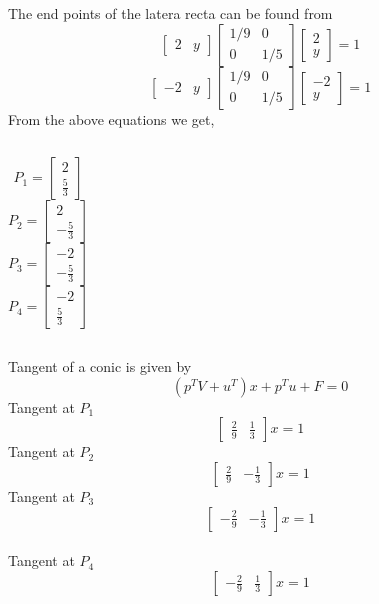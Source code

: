 \documentclass{beamer}
\begin{document}
\begin{frame}
The end points of the latera recta can be found from
\[
\begin{bmatrix}
2&
y
\end{bmatrix}
\begin{bmatrix}
1/9 & 0\\
0 & 1/5
\end{bmatrix}
\begin{bmatrix}
2 \\ y
\end{bmatrix}
=
1\]
\[
\begin{bmatrix}
-2&
y
\end{bmatrix}
\begin{bmatrix}
1/9 & 0\\
0 & 1/5
\end{bmatrix}
\begin{bmatrix}
-2 \\ y
\end{bmatrix}
=
1\]
From the above equations we get,
\begin{columns}[onlytextwidth]
\[P_1
=
\begin{bmatrix}
2\\
\frac{5}{3}
\end{bmatrix}
\]
\[P_2
=
\begin{bmatrix}
2\\
-\frac{5}{3}
\end{bmatrix}
\]
\[P_3
=
\begin{bmatrix}
-2\\
-\frac{5}{3}
\end{bmatrix}
\]
\[P_4
=
\begin{bmatrix}
-2\\
\frac{5}{3}
\end{bmatrix}
\]
\end{columns}
\end{frame}

\begin{frame}
Tangent of a conic is given by
\[(p^T V + u^T) x + p^T u + F = 0\]
Tangent at $P_1$
\[
\begin{bmatrix}
\frac{2}{9} & \frac{1}{3}
\end{bmatrix}
x
=
1
\]
Tangent at $P_2$
\[
\begin{bmatrix}
\frac{2}{9} & -\frac{1}{3}
\end{bmatrix}
x
=
1
\]
Tangent at $P_3$
\[
\begin{bmatrix}
-\frac{2}{9} & -\frac{1}{3}
\end{bmatrix}
x
=
1
\]\\
Tangent at $P_4$
\[
\begin{bmatrix}
-\frac{2}{9} & \frac{1}{3}
\end{bmatrix}
x
=
1
\]
\end{frame}
\end{document}
